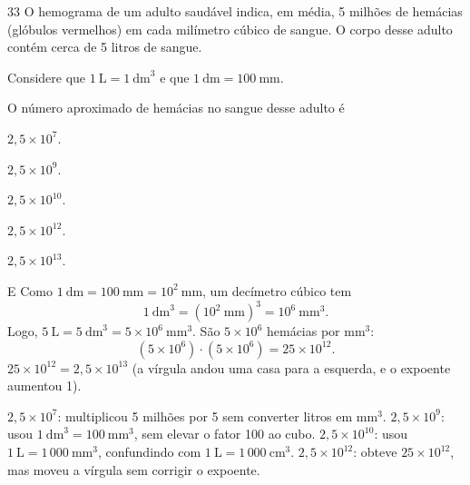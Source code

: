 \begin{questaoinedita}{3}{3}
O hemograma de um adulto saudável indica, em média, 5 milhões de hemácias (glóbulos vermelhos) em
cada milímetro cúbico de sangue. O corpo desse adulto contém cerca de 5 litros de sangue.

Considere que $1~\text{L}=1~\text{dm}^3$ e que $1~\text{dm}=100~\text{mm}$.

O número aproximado de hemácias no sangue desse adulto é
\begin{alternativas*}[5]
\item $2,5\times 10^{7}$.
\item $2,5\times 10^{9}$.
\item $2,5\times 10^{10}$.
\item $2,5\times 10^{12}$.
\item $2,5\times 10^{13}$.
\end{alternativas*}
\end{questaoinedita}
\begin{resolucao}{E}
 Como $1~\text{dm}=100~\text{mm}=10^2~\text{mm}$, um
decímetro cúbico tem
\[1~\text{dm}^3=(10^2~\text{mm})^3=10^6~\text{mm}^3.\]
Logo, $5~\text{L}=5~\text{dm}^3=5\times 10^6~\text{mm}^3$.
 São $5\times 10^6$ hemácias por mm$^3$:
\[(5\times 10^6)\cdot(5\times 10^6)=25\times 10^{12}.\]
 $25\times 10^{12}=2,5\times 10^{13}$ (a vírgula andou uma
casa para a esquerda, e o expoente aumentou 1).
\begin{distratores}
 $2,5\times 10^{7}$: multiplicou 5 milhões por 5 sem converter litros em mm$^3$.
 $2,5\times 10^{9}$: usou $1~\text{dm}^3=100~\text{mm}^3$, sem elevar o fator 100 ao cubo.
 $2,5\times 10^{10}$: usou $1~\text{L}=1\,000~\text{mm}^3$, confundindo com $1~\text{L}=1\,000~\text{cm}^3$.
 $2,5\times 10^{12}$: obteve $25\times 10^{12}$, mas moveu a vírgula sem corrigir o expoente.
\end{distratores}
\end{resolucao}

